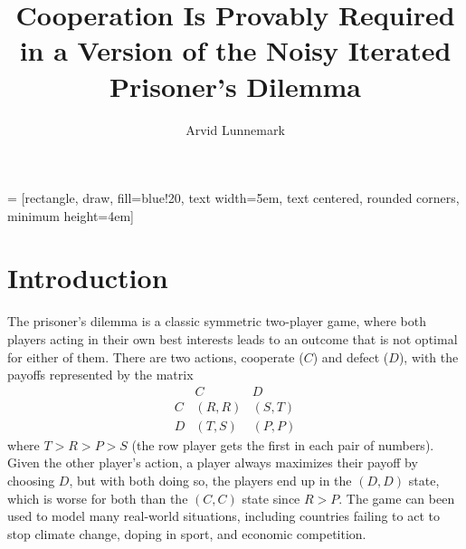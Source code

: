 \documentclass[11pt]{amsart}
\title{Cooperation Is Provably Required in a Version of the Noisy Iterated Prisoner's Dilemma}
\author{Arvid Lunnemark}
\theoremstyle{definition}
\theoremstyle{remark}
\begin{document}
 = [rectangle, draw, fill=blue!20, 
    text width=5em, text centered, rounded corners, minimum height=4em]

\maketitle

\section{Introduction}

The prisoner's dilemma is a classic symmetric two-player game, where both players acting in their own best interests leads to an outcome that is not optimal for either of them. There are two actions, cooperate ($C$) and defect ($D$), with the payoffs represented by the matrix
\begin{equation*}
  \begin{matrix}
      &  C & D \\ 
    C &  (R, R) & (S, T) \\
    D & (T, S) & (P, P)
  \end{matrix}
\end{equation*} 
where $T > R > P > S$ (the row player gets the first in each pair of numbers). Given the other player's action, a player always maximizes their payoff by choosing $D$, but with both doing so, the players end up in the $(D, D)$ state, which is worse for both than the $(C, C)$ state since $R > P$. The game can been used to model many real-world situations, including countries failing to act to stop climate change, doping in sport, and economic competition.
\end{document}
